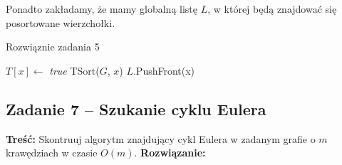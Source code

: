 Ponadto zakładamy, że mamy globalną listę $L$, w której 
będą znajdować się posortowane wierzchołki.

\begin{algorithm}[H]
	\caption{Rozwiąznie zadania 5}
	\begin{algorithmic}[1]
		\State $T[x] \gets$ \textit{true}
		\State TSort($G$, $x$)
		\EndIf
		\EndWhile
		\State $L$.PushFront(x)
		\EndProcedure
	\end{algorithmic}
	\label{Zadanie26}
\end{algorithm}

\subsection{Zadanie 7 -- Szukanie cyklu Eulera}
\textbf{Treść: } Skontruuj algorytm znajdujący cykl Eulera 
w zadanym grafie o $m$ krawędziach w czasie $O(m)$.
\textbf{Rozwiązanie: }